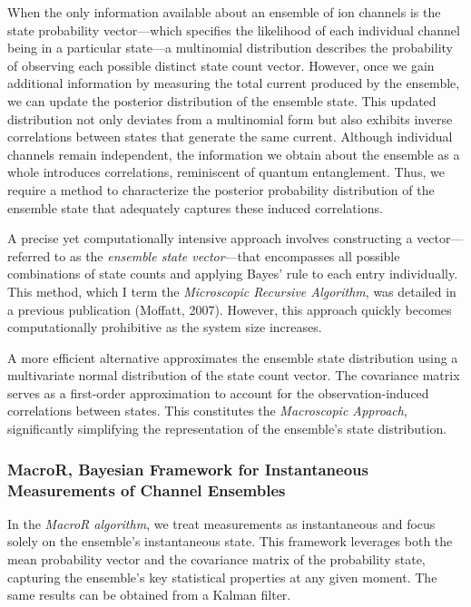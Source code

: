 \documentclass[pdflatex,sn-mathphys-num]{sn-jnl}%
\theoremstyle{thmstyleone}%
\theoremstyle{thmstyletwo}%
\theoremstyle{thmstylethree}%
\begin{document}
When the only information available about an ensemble of ion channels is the state probability vector—which specifies the likelihood of each individual channel being in a particular state—a multinomial distribution describes the probability of observing each possible distinct state count vector. However, once we gain additional information by measuring the total current produced by the ensemble, we can update the posterior distribution of the ensemble state. This updated distribution not only deviates from a multinomial form but also exhibits inverse correlations between states that generate the same current. Although individual channels remain independent, the information we obtain about the ensemble as a whole introduces correlations, reminiscent of quantum entanglement. Thus, we require a method to characterize the posterior probability distribution of the ensemble state that adequately captures these induced correlations.

A precise yet computationally intensive approach involves constructing a vector—referred to as the \textit{ensemble state vector}—that encompasses all possible combinations of state counts and applying Bayes' rule to each entry individually. This method, which I term the \textit{Microscopic Recursive Algorithm}, was detailed in a previous publication (Moffatt, 2007). However, this approach quickly becomes computationally prohibitive as the system size increases.

A more efficient alternative approximates the ensemble state distribution using a multivariate normal distribution of the state count vector. The covariance matrix serves as a first-order approximation to account for the observation-induced correlations between states. This constitutes the \textit{Macroscopic Approach}, significantly simplifying the representation of the ensemble's state distribution.

\subsubsection{MacroR, Bayesian Framework for Instantaneous Measurements of Channel Ensembles}

In the \textit{MacroR algorithm}, we treat measurements as instantaneous and focus solely on the ensemble's instantaneous state. This framework leverages both the mean probability vector and the covariance matrix of the probability state, capturing the ensemble's key statistical properties at any given moment. The same results can be obtained from a Kalman filter. 
\end{document}
